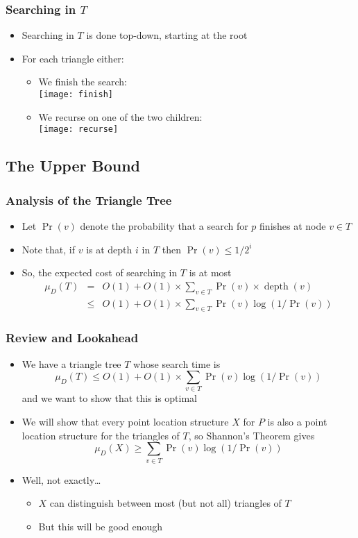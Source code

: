 \documentclass{beamer}
\DeclareMathOperator{\depth}{depth}
\begin{document}
\frame
{
   \frametitle{Searching in $T$}
   \begin{itemize}
     \item<1-> Searching in $T$ is done top-down, starting at the root
     \item<2-> For each triangle either:
      \begin{itemize}
        \item<3-> We finish the search:\\
          \texttt{[image: finish]}
        \item<4-> We recurse on one of the two children:\\
          \texttt{[image: recurse]}
      \end{itemize}
   \end{itemize}
}

\subsection{The Upper Bound}
\frame
{
   \frametitle{Analysis of the Triangle Tree}
   \begin{itemize}
   \item<1-> Let $\Pr(v)$ denote the probability that a search for $p$ 
	finishes at node $v\in T$
   \item<2-> Note that, if $v$ is at depth $i$ in $T$ then $\Pr(v)\le 1/2^i$
   \item<3-> So, the expected cost of searching in $T$ is at most
   \begin{eqnarray*}
      \mu_D(T) 
    &=& O(1) + O(1)\times\sum_{v\in T} \Pr(v)\times\depth(v) \\
       &\le& O(1)+O(1)\times \sum_{v\in T} \Pr(v)\log(1/\Pr(v))
   \end{eqnarray*}
   \end{itemize}

}

\frame
{
	\frametitle{Review and Lookahead}
	\begin{itemize}
	\item<1-> We have a triangle tree $T$ whose search time is
	 \[ \mu_D(T) \le O(1)+O(1)\times \sum_{v\in T} \Pr(v)\log(1/\Pr(v))
         \]
	and we want to show that this is optimal 
        \item<2-> We will show that every point location structure $X$ for
	$P$ is also a point location structure for the triangles of
$T$, so Shannon's Theorem gives
	 \[ \mu_D(X) \ge \sum_{v\in T} \Pr(v)\log(1/\Pr(v))
         \]
        \item<3-> Well, not exactly\ldots
          \begin{itemize}
		\item<4-> $X$ can distinguish between most (but not all) triangles of $T$
		\item<5-> But this will be good enough
          \end{itemize}
	\end{itemize}
}
\end{document}
